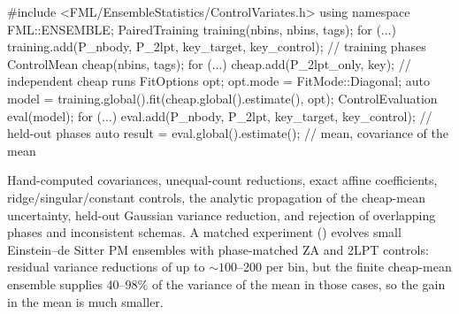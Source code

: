 \begin{cppcode}
#include <FML/EnsembleStatistics/ControlVariates.h>
using namespace FML::ENSEMBLE;
PairedTraining training(nbins, nbins, tags);
for (...) training.add(P_nbody, P_2lpt, key_target, key_control);   // training phases
ControlMean cheap(nbins, tags);
for (...) cheap.add(P_2lpt_only, key);                              // independent cheap runs
FitOptions opt;  opt.mode = FitMode::Diagonal;
auto model = training.global().fit(cheap.global().estimate(), opt);
ControlEvaluation eval(model);
for (...) eval.add(P_nbody, P_2lpt, key_target, key_control);       // held-out phases
auto result = eval.global().estimate();       // mean, covariance of the mean
\end{cppcode}

\begin{validation}
Hand-computed covariances, unequal-count reductions, exact affine coefficients, ridge/singular/constant controls, the analytic propagation of the cheap-mean
uncertainty, held-out Gaussian variance reduction, and rejection of overlapping phases and inconsistent schemas. A matched experiment ()
evolves small Einstein--de Sitter PM ensembles with phase-matched ZA and 2LPT controls: residual variance reductions of up to $\sim100$--200 per bin, but the
finite cheap-mean ensemble supplies 40--98\% of the variance of the mean in those cases, so the gain in the mean is much smaller.
\end{validation}
